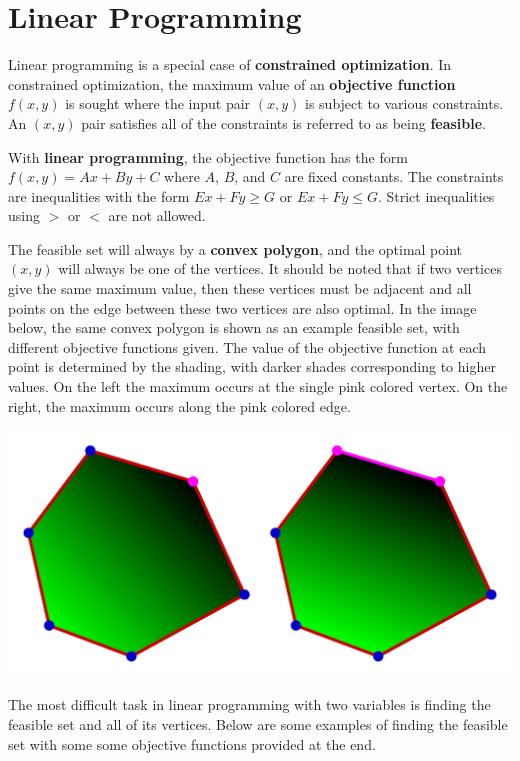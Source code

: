 \documentclass{article}
\begin{document}
\section*{Linear Programming}

Linear programming is a special case of {\bf constrained optimization}. In constrained optimization, the maximum value of an {\bf objective function} \(f(x,y)\) is sought where the input pair \((x, y)\) is subject to various constraints. An \((x, y)\) pair satisfies all of the constraints is referred to as being {\bf feasible}. 

With {\bf linear programming}, the objective function has the form \(f(x,y) = Ax + By + C\) where \(A\), \(B\), and \(C\) are fixed constants. The constraints are inequalities with the form \(Ex + Fy \geq G\) or \(Ex + Fy \leq G\). Strict inequalities using \(>\) or \(<\) are not allowed. 

The feasible set will always by a {\bf convex polygon}, and the optimal point \((x, y)\) will always be one of the vertices. It should be noted that if two vertices give the same maximum value, then these vertices must be adjacent and all points on the edge between these two vertices are also optimal. In the image below, the same convex polygon is shown as an example feasible set, with different objective functions given. The value of the objective function at each point is determined by the shading, with darker shades corresponding to higher values. On the left the maximum occurs at the single pink colored vertex. On the right, the maximum occurs along the pink colored edge.

\includegraphics[width = \textwidth]{convex_polygon}

The most difficult task in linear programming with two variables is finding the feasible set and all of its vertices. Below are some examples of finding the feasible set with some some objective functions provided at the end.
\end{document}
